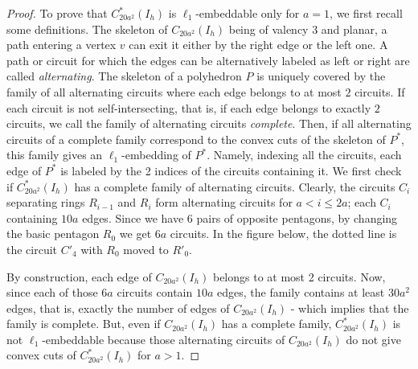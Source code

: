 \begin{proposition}
\begin{proof}
To prove that $C^*_{20a^2}(I_h)$ is $\ell_1$-embeddable only for $a=1$,
we first recall some definitions. The skeleton of $C_{20a^2}(I_h)$ being of
valency 3 and planar, a path entering a vertex $v$ can exit it either by the
right edge or the left one. A path or circuit for which the edges can be alternatively
labeled as left or right are called {\em alternating}. The skeleton of a polyhedron $P$
is uniquely covered by the family of all alternating circuits where each edge belongs
to at most $2$ circuits. If each circuit is not self-intersecting, that is, if
each edge belongs to exactly $2$ circuits, we call the family of alternating circuits
{\em complete}.
Then, if all alternating circuits of a complete family correspond to the convex cuts of the
skeleton of $P^*$, this family gives an $\ell_1$-embedding of $P^*$. Namely, indexing all
the circuits, each edge of $P^*$ is labeled by the 2 indices of the circuits containing it.
We first check if $C^*_{20a^2}(I_h)$ has a complete family of alternating circuits. Clearly,
the circuits $C_i$ separating rings $R_{i-1}$ and $R_i$ form alternating circuits
for $a< i \leq 2a$; each $C_i$ containing $10a$ edges. Since we have 6 pairs of
opposite pentagons, by changing the basic pentagon $R_0$ we get $6a$ circuits. In the
figure below,
the dotted line is the circuit $C'_4$ with $R_0$ moved to $R'_0$.
\begin{center}
\end{center}
By construction, each edge of $C_{20a^2}(I_h)$ belongs to at most 2 circuits. Now, since each of 
those
$6a$ circuits contain $10a$ edges, the family contains at least $30a^2$ edges, that is, exactly
the number of edges of $C_{20a^2}(I_h)$ - which implies that the family is complete. But, even if
$C_{20a^2}(I_h)$ has a complete family, $C^*_{20a^2}(I_h)$ is not $\ell_1$-embeddable because those
alternating circuits of $C_{20a^2}(I_h)$ do not give convex cuts of $C^*_{20a^2}(I_h)$ for $a>1$. 


\end{proof}
\end{proposition}
